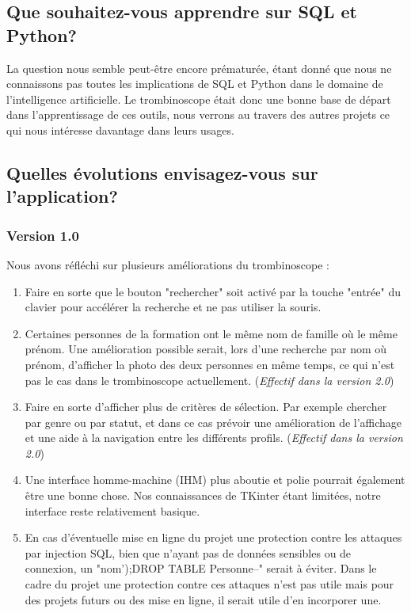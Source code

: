 \documentclass[french]{article}
\begin{document}
\subsection{Que souhaitez-vous apprendre sur SQL et Python?}
    La question nous semble peut-être encore prématurée, étant donné que nous ne connaissons pas toutes les implications de SQL et Python dans le domaine de l'intelligence artificielle. Le trombinoscope était donc une bonne base de départ dans l'apprentissage de ces outils, nous verrons au travers des autres projets ce qui nous intéresse davantage dans leurs usages. 
\subsection{Quelles évolutions envisagez-vous sur l'application?}
\subsubsection{Version 1.0}
    \noindent Nous avons réfléchi sur plusieurs améliorations du trombinoscope :
    \begin{enumerate}
        \item Faire en sorte que le bouton "rechercher" soit activé par la touche "entrée" du clavier pour accélérer la recherche et ne pas utiliser la souris.
        \item Certaines personnes de la formation ont le même nom de famille où le même prénom. Une amélioration possible serait, lors d'une recherche par nom où prénom, d'afficher la photo des deux personnes en même temps, ce qui n'est pas le cas dans le trombinoscope actuellement. (\textit{Effectif dans la version 2.0}) 
        \item Faire en sorte d'afficher plus de critères de sélection. Par exemple chercher par genre ou par statut, et dans ce cas prévoir une amélioration de l'affichage et une aide à la navigation entre les différents profils. (\textit{Effectif dans la version 2.0}) 
        \item Une interface homme-machine (IHM) plus aboutie et polie pourrait également être une bonne chose. Nos connaissances de TKinter étant limitées, notre interface reste relativement basique. 
        \item En cas d'éventuelle mise en ligne du projet une protection contre les attaques par injection SQL, bien que n'ayant pas de données sensibles ou de connexion, un "nom');DROP TABLE Personne--" serait à éviter. Dans le cadre du projet une protection contre ces attaques n'est pas utile mais pour des projets futurs ou des mise en ligne, il serait utile d'en incorporer une. 
        
    \end{enumerate}
      
\end{document}
